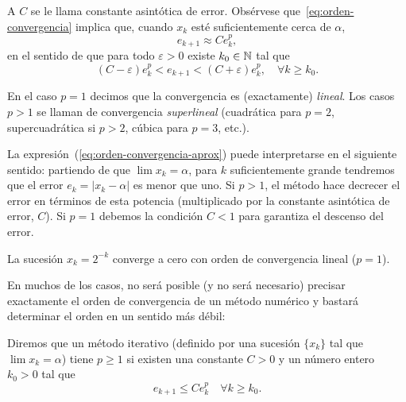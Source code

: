 A $C$ se le llama constante asintótica de error.
Obsérvese que~\eqref{eq:orden-convergencia} implica que, cuando $x_k$
esté suficientemente cerca de $\alpha$,
\begin{equation}
  \label{eq:orden-convergencia-aprox}
  e_{k+1} \approx C e_k^p,
\end{equation}
en el sentido de que para todo $\varepsilon>0$ existe $k_0\in\operatorname{{\mathbb N}}$ tal que
\begin{equation*}
  \label{eq:orden-convergencia-2}
  (C-\varepsilon) e_k^p < e_{k+1} <
  (C+\varepsilon)  e_k^p, \quad \forall k \ge k_0.
\end{equation*}

En el caso $p=1$ decimos que la convergencia es (exactamente)
\textit{lineal}. Los casos $p>1$ se llaman de convergencia
\textit{superlineal} (cuadrática para $p=2$, supercuadrática si $p>2$,
cúbica para $p=3$, etc.).


\begin{remark}
  \label{rk:interpretacion-orden-convergencia}
  La expresión~(\ref{eq:orden-convergencia-aprox}) puede interpretarse
  en el siguiente sentido: partiendo de que $\lim x_k=\alpha$, para
  $k$ suficientemente grande tendremos que el error $e_k=|x_k-\alpha|$ es
  menor que uno. Si $p>1$, el método hace decrecer el error en
  términos de esta potencia (multiplicado por la constante asintótica
  de error, $C$). Si $p=1$ debemos la condición $C<1$ para garantiza el
  descenso del error.\label{rk:1}
\end{remark}

\begin{example}
  \label{rk:2}
  La sucesión $x_k=2^{-k}$ converge a cero con orden de convergencia lineal ($p=1$).
\end{example}

En muchos de los casos, no será posible (y no será necesario)
precisar exactamente el orden de convergencia de un método numérico y
bastará determinar el orden en un sentido más débil:

\begin{definition}
  Diremos que un método iterativo (definido por una sucesión $\{x_k\}$ tal
  que $\lim x_k=\alpha$) tiene 
  $p\ge 1$ si existen una constante $C>0$ y un número entero $k_0>0$
  tal que
  \begin{equation}
    \label{eq:orden-convergencia-al-menos-p}
    e_{k+1} \le C e_k^p \quad \forall k\ge k_0.
  \end{equation}
\end{definition}

